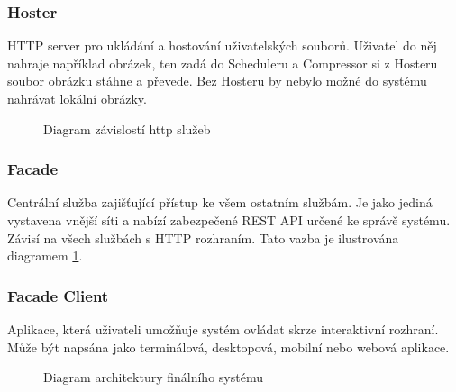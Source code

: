 \subsubsection*{Hoster}
HTTP server pro ukládání a hostování uživatelských souborů. Uživatel do něj nahraje například obrázek, ten zadá do Scheduleru a Compressor si z Hosteru soubor obrázku stáhne a převede. Bez Hosteru by nebylo možné do systému nahrávat lokální obrázky.

\vspace{1cm}
\begin{figure}[h]
    \centering
    
    \caption{Diagram závislostí http služeb}
    \label{fig:final-system-http-services}
\end{figure}

\subsubsection*{Facade}
Centrální služba zajišťující přístup ke všem ostatním službám. Je jako jediná vystavena vnější síti a nabízí zabezpečené REST API určené ke správě systému. Závisí na všech službách s HTTP rozhraním. Tato vazba je ilustrována diagramem \ref{fig:final-system-http-services}.

\subsubsection*{Facade Client}
Aplikace, která uživateli umožňuje systém ovládat skrze interaktivní rozhraní. Může být napsána jako terminálová, desktopová, mobilní nebo webová aplikace.

\vspace{1cm}
\begin{figure}[h]
    \centering
    
    \caption{Diagram architektury finálního systému}
    \label{fig:final-system-architecture}
\end{figure}